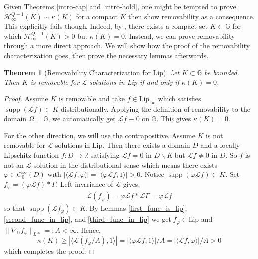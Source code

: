 \documentclass[12pt,a4paper,reqno]{amsart}
\DeclareMathOperator{\supp}{supp}
\newcommand{\cg}{\Gamma}
\renewcommand{\L}{\mathcal{L}}
\renewcommand{\k}{\kappa}
\newcommand{\R}{\mathbb{R}}
\newcommand{\G}{\mathbb{G}}
\newcommand{\h}{\mathcal{H}_{\infty}}
\numberwithin{equation}{section}
\newtheorem{thm}{Theorem}[section]
\theoremstyle{definition}
\begin{document}
Given Theorems \ref{intro-cap} and \ref{intro-hold}, one might be tempted to prove $\h^{Q-1}(K) \sim \k(K)$ for a compact $K$ then show removability as a consequence. This explicitly fails though. Indeed, by \cite[Theorem 1.2]{CMT}, there exists a compact set $K \subset \G$ for which $\mathcal{H}_{\infty}^{Q-1}(K) > 0$ but $\k(K) = 0$. Instead, we can prove removability through a more direct approach. We will show how the proof of the removability characterization goes, then prove the necessary lemmas afterwards.

\begin{thm}[Removability Characterization for Lip]\label{rem-for-lip}
Let $K \subset \G$ be bounded. Then $K$ is removable for $\L$-solutions in Lip if and only if $\k(K) =0$.    
\end{thm}
\begin{proof}
Assume $K$ is removable and take $f \in \text{Lip}_{\text{loc}}$ which satisfies $\supp (\L f)\subset K$ distributionally. Applying the definition of removability to the domain $\Omega = \G$, we automatically get $\L f \equiv 0$ on $\G$. This gives $\k(K) = 0$.

For the other direction, we will use the contrapositive. Assume $K$ is not removable for $\L$-solutions in $\text{Lip}$. Then there exists a domain $D$ and a locally Lipschitz function $f: D \rightarrow \R$ satisfying $\L f = 0$ in $D \backslash K$ but $\L f \neq 0$ in $D$. So $f$ is not an $\L$-solution in the distributional sense which means there exists $\varphi \in C_0^{\infty}(D)$ with $|\langle \L f, \varphi \rangle| = |\langle \varphi \L f, 1 \rangle| > 0$. Notice $\supp( \varphi \L f) \subset K$. Set $f_{\varphi} = (\varphi \L f) \ast \cg$. Left-invariance of $\L$ gives, \begin{align*}
    \L(f_{\varphi}) = \varphi \L f \ast \L \cg = \varphi \L f
\end{align*} so that $\supp ( \L f_{\varphi}) \subset K$. By Lemmas \ref{first_func_is_lip}, \ref{second_func_in_lip}, and \ref{third_func_in_lip} we get $f_{\varphi}\in \text{Lip}$ and $\| \nabla_{\G} f_{\varphi}\|_{L^{\infty}}=: A < \infty$. Hence, 
$$\k(K) \geq |\langle \L (f_{\varphi}/A), 1 \rangle| = |\langle \varphi \L f, 1 \rangle|/A = |\langle \L f , \varphi \rangle| /A > 0$$  which completes the proof.
\end{proof}
\end{document}
